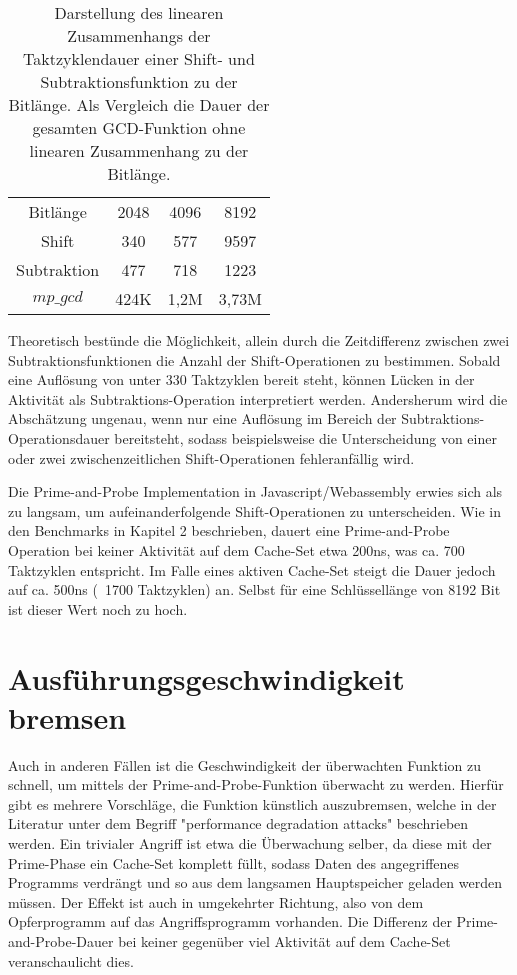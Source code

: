 \begin{table}[h]
\caption{Darstellung des linearen Zusammenhangs der Taktzyklendauer einer Shift- und Subtraktionsfunktion zu der Bitlänge. Als Vergleich die Dauer der gesamten GCD-Funktion ohne linearen Zusammenhang zu der Bitlänge.}
\label{tbl:ShiftSubCycles}
\begin{tabular}{cccc}
Bitlänge    & 2048 & 4096 & 8192 \\
Shift       & 340  & 577  & 9597 \\
Subtraktion & 477  & 718  & 1223 \\
$mp\_gcd$    & 424K & 1,2M & 3,73M
\end{tabular}
\end{table}

Theoretisch bestünde die Möglichkeit, allein durch die Zeitdifferenz zwischen zwei Subtraktionsfunktionen die Anzahl der Shift-Operationen zu bestimmen.
Sobald eine Auflösung von unter 330 Taktzyklen bereit steht, können Lücken in der Aktivität als Subtraktions-Operation interpretiert werden.
Andersherum wird die Abschätzung ungenau, wenn nur eine Auflösung im Bereich der Subtraktions-Operationsdauer bereitsteht, sodass beispielsweise die Unterscheidung von einer oder zwei zwischenzeitlichen Shift-Operationen fehleranfällig wird.

Die Prime-and-Probe Implementation in Javascript/Webassembly erwies sich als zu langsam, um aufeinanderfolgende Shift-Operationen zu unterscheiden.
Wie in den Benchmarks in Kapitel 2 beschrieben, dauert eine Prime-and-Probe Operation bei keiner Aktivität auf dem Cache-Set etwa 200ns, was ca. 700 Taktzyklen entspricht.
Im Falle eines aktiven Cache-Set steigt die Dauer jedoch auf ca. 500ns (~1700 Taktzyklen) an.
Selbst für eine Schlüssellänge von 8192 Bit ist dieser Wert noch zu hoch.

\section{Ausführungsgeschwindigkeit bremsen}
\label{PerformanceDegSingleThread}

Auch in anderen Fällen ist die Geschwindigkeit der überwachten Funktion zu schnell, um mittels der Prime-and-Probe-Funktion überwacht zu werden.
Hierfür gibt es mehrere Vorschläge, die Funktion künstlich auszubremsen, welche in der Literatur \cite{MemoryLockingWu,MemoryLockingRisenpart,MemoryLockingJavaAndroid} unter dem Begriff "performance degradation attacks" beschrieben werden.
Ein trivialer Angriff ist etwa die Überwachung selber, da diese mit der Prime-Phase ein Cache-Set komplett füllt, sodass Daten des angegriffenes Programms verdrängt und so aus dem langsamen Hauptspeicher geladen werden müssen.
Der Effekt ist auch in umgekehrter Richtung, also von dem Opferprogramm auf das Angriffsprogramm vorhanden.
Die Differenz der Prime-and-Probe-Dauer bei keiner gegenüber viel Aktivität auf dem Cache-Set veranschaulicht dies.

